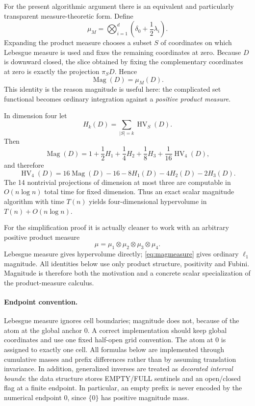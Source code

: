 \documentclass[12pt,a4paper]{article}
\theoremstyle{definition}
\newcommand{\HV}{\operatorname{HV}}
\newcommand{\Mag}{\operatorname{Mag}}
\newcommand{\1}{\mathbf 1}
\begin{document}
For the present algorithmic argument there is an equivalent and particularly transparent measure-theoretic form. Define
\begin{equation}
\mu_M=\bigotimes_{i=1}^d\left(\delta_0+\frac12\lambda_i\right).          \label{eq:magmeasure}
\end{equation}
Expanding the product measure chooses a subset $S$ of coordinates on which Lebesgue measure is used and fixes the remaining coordinates at zero. Because $D$ is downward closed, the slice obtained by fixing the complementary coordinates at zero is exactly the projection $\pi_S D$. Hence
\begin{equation}
\boxed{\Mag(D)=\mu_M(D).}                                      \label{eq:magmass}
\end{equation}
This identity is the reason magnitude is useful here: the complicated set functional becomes ordinary integration against a \emph{positive product measure}.

In dimension four let
\[
H_k(D)=\sum_{|S|=k}\HV_S(D).
\]
Then
\begin{equation}
\Mag(D)=1+\frac12H_1+\frac14H_2+\frac18H_3+\frac1{16}\HV_4(D),      \label{eq:mag4}
\end{equation}
and therefore
\begin{equation}
\boxed{\HV_4(D)=16\Mag(D)-16-8H_1(D)-4H_2(D)-2H_3(D).}             \label{eq:recoverHV}
\end{equation}
The 14 nontrivial projections of dimension at most three are computable in $O(n\log n)$ total time for fixed dimension. Thus an exact scalar magnitude algorithm with time $T(n)$ yields four-dimensional hypervolume in $T(n)+O(n\log n)$.

For the simplification proof it is actually cleaner to work with an arbitrary positive product measure
\[
\mu=\mu_1\otimes\mu_2\otimes\mu_3\otimes\mu_4.
\]
Lebesgue measure gives hypervolume directly; \eqref{eq:magmeasure} gives ordinary $\ell_1$ magnitude. All identities below use only product structure, positivity and Fubini. Magnitude is therefore both the motivation and a concrete scalar specialization of the product-measure calculus.

\paragraph{Endpoint convention.}
Lebesgue measure ignores cell boundaries; magnitude does not, because of the atom at the global anchor 0. A correct implementation should keep global coordinates and use one fixed half-open grid convention. The atom at 0 is assigned to exactly one cell. All formulas below are implemented through cumulative masses and prefix differences rather than by assuming translation invariance. In addition, generalized inverses are treated as \emph{decorated interval bounds}: the data structure stores EMPTY/FULL sentinels and an open/closed flag at a finite endpoint. In particular, an empty prefix is never encoded by the numerical endpoint $0$, since $\{0\}$ has positive magnitude mass.
\end{document}
